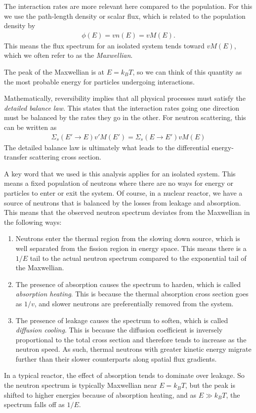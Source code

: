 The interaction rates are more relevant here compared to the population. For this we use the path-length density or scalar flux, which is related to the population density by
\begin{align}
  \phi(E) = v n(E) = v M(E).
\end{align}
This means the flux spectrum for an isolated system tends toward $v M(E)$, which we often refer to as the \emph{Maxwellian}. 

The peak of the Maxwellian is at $E = k_B T$, so we can think of this quantity as the most probable energy for particles undergoing interactions.

Mathematically, reversibility implies that all physical processes must satisfy the \emph{detailed balance law}. This states that the interaction rates going one direction must be balanced by the rates they go in the other. For neutron scattering, this can be written as
\begin{align}
  \Sigma_s( E' \rightarrow E ) v' M(E') = \Sigma_s( E \rightarrow E' ) v M(E)
\end{align}
The detailed balance law is ultimately what leads to the differential energy-transfer scattering cross section.

A key word that we used is this analysis applies for an isolated system. This means a fixed population of neutrons where there are no ways for energy or particles to enter or exit the system. Of course, in a nuclear reactor, we have a source of neutrons that is balanced by the losses from leakage and absorption. This means that the observed neutron spectrum deviates from the Maxwellian in the following ways:
\begin{enumerate}
  \item Neutrons enter the thermal region from the slowing down source, which is well separated from the fission region in energy space. This means there is a $1/E$ tail to the actual neutron spectrum compared to the exponential tail of the Maxwellian.
  \item The presence of absorption causes the spectrum to harden, which is called \emph{absorption heating}. This is because the thermal absorption cross section goes as $1/v$, and slower neutrons are preferentially removed from the system.
  \item The presence of leakage causes the spectrum to soften, which is called \emph{diffusion cooling}. This is because the diffusion coefficient is inversely proportional to the total cross section and therefore tends to increase as the neutron speed. As such, thermal neutrons with greater kinetic energy migrate further than their slower counterparts along spatial flux gradients.
\end{enumerate}
In a typical reactor, the effect of absorption tends to dominate over leakage. So the neutron spectrum is typically Maxwellian near $E = k_B T$, but the peak is shifted to higher energies because of absorption heating, and as $E \gg k_B T$, the spectrum falls off as $1/E$.

